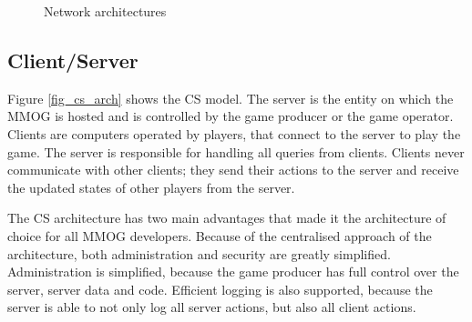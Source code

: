 \documentclass[10pt,a4paper,journal,cspaper,compsoc]{IEEEtran}
\begin{document}
\begin{figure}[htbp]
\centering
\caption{Network architectures}
\end{figure}

\subsection{Client/Server}
\label{client_server_network_model}

Figure \ref{fig_cs_arch} shows the \ac{CS} model. The server is the entity on which the MMOG is hosted and is controlled by the game producer or the
game operator. Clients are computers operated by players, that connect to the server to play the game. The server is responsible for handling all
queries from clients. Clients never communicate with other clients; they send their actions to the server and receive the updated states of other
players from the server.

The \ac{CS} architecture has two main advantages that made it the architecture of choice for all MMOG developers. Because of the centralised approach
of the architecture, both administration and security are greatly simplified. Administration is simplified, because the game producer has full
control over the server, server data and code. Efficient logging is also supported, because the server is able to not only log all server actions,
but also all client actions.
\end{document}
